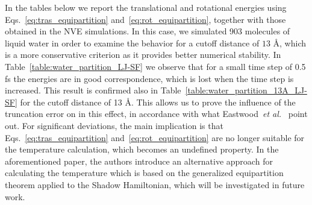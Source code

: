 \documentclass[aip,jcp,reprint,amsmath,amssymb]{revtex4-1}
\begin{document}
In the tables below we report the translational and rotational energies using Eqs.~\ref{eq:tras_equipartition} and~\ref{eq:rot_equipartition}, together with those obtained in the NVE simulations. In this case, we simulated 903 molecules of liquid water in order to examine the behavior for a cutoff distance of $13$ {\AA}, which is a more conservative criterion as it provides better numerical stability. In Table~\ref{table:water_partition_LJ-SF} we observe that for a small time step of 0.5 fs the energies are in good correspondence, which is lost when the time step is increased. This result is confirmed also in Table~\ref{table:water_partition_13A_LJ-SF} for the cutoff distance of 13 {\AA}. This allows us to prove the influence of the truncation error on in this effect, in accordance with what Eastwood~\textit{et al.}~\cite{Eastwood_2010} point out. For significant deviations, the main implication is that Eqs.~\ref{eq:tras_equipartition} and~\ref{eq:rot_equipartition} are no longer suitable for the temperature calculation, which becomes an undefined property. In the aforementioned paper, the authors introduce an alternative approach for calculating the temperature which is based on the generalized equipartition theorem applied to the Shadow Hamiltonian, which will be investigated in future work.

\end{document}

